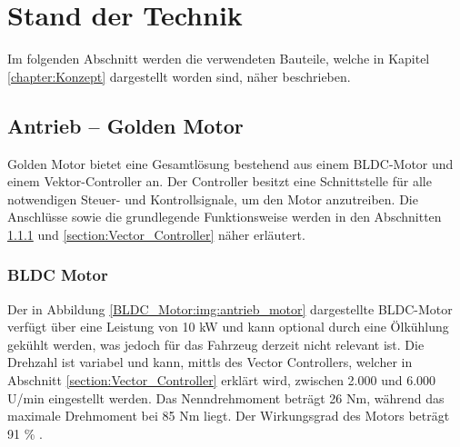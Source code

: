 \chapter{Stand der Technik}
\label{chapter:Stand_der_Technik}



Im folgenden Abschnitt werden die verwendeten Bauteile, welche in Kapitel \ref{chapter:Konzept} dargestellt worden sind, näher beschrieben.


\section{Antrieb – Golden Motor}
\label{section:Antrieb}

Golden Motor bietet eine Gesamtlösung bestehend aus einem BLDC-Motor und einem Vektor-Controller an. Der Controller besitzt eine Schnittstelle für alle notwendigen Steuer- und Kontrollsignale, um den Motor anzutreiben. Die Anschlüsse sowie die grundlegende Funktionsweise werden in den Abschnitten \ref{section:BLDC_Motor} und \ref{section:Vector_Controller} näher erläutert.



\subsection{BLDC Motor}
\label{section:BLDC_Motor}

Der in Abbildung \ref{BLDC_Motor:img:antrieb_motor} dargestellte BLDC-Motor verfügt über eine Leistung von 10 kW und kann optional durch eine Ölkühlung gekühlt werden, was jedoch für das Fahrzeug derzeit nicht relevant ist. Die Drehzahl ist variabel und kann, mittls des Vector Controllers, welcher in Abschnitt \ref{section:Vector_Controller} erklärt wird, zwischen 2.000 und 6.000 U/min eingestellt werden. Das Nenndrehmoment beträgt 26 Nm, während das maximale Drehmoment bei 85 Nm liegt. Der Wirkungsgrad des Motors beträgt 91 \% \cite{Golden_Motor:bldc_motor}.

